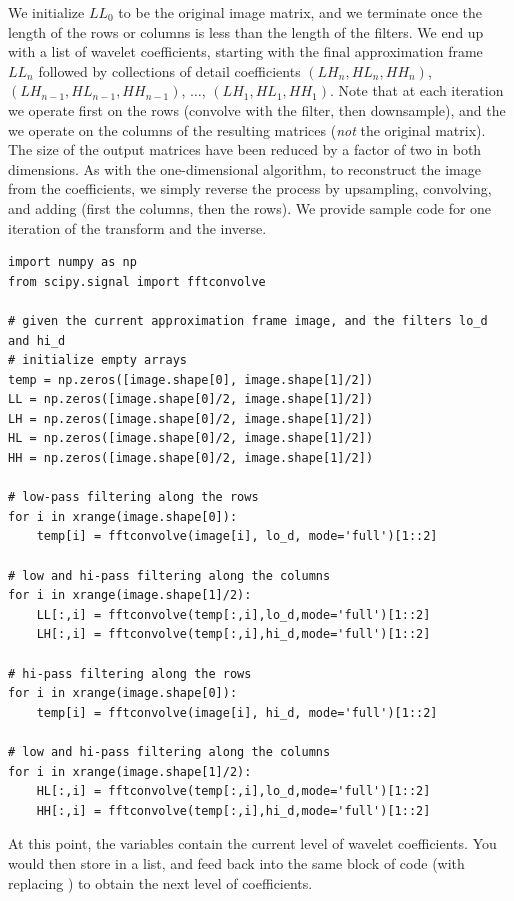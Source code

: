 We initialize $LL_0$ to be the
original image matrix, and we terminate once the length of the rows or columns
is less than the length of the filters. We end up with a list of wavelet
coefficients, starting with the final approximation frame $LL_n$ followed by
collections of detail coefficients $(LH_n,HL_n,HH_n)$, $(LH_{n-1},HL_{n-1},HH_{n-1})$,
$\ldots$, $(LH_1,HL_1,HH_1)$. Note that at each iteration we operate first on the
rows (convolve with the filter, then downsample), and the we operate on the columns
of the resulting matrices (\emph{not} the original matrix). The size of the output
matrices have been reduced by a factor of two in both dimensions. As with the
one-dimensional algorithm, to reconstruct the image from the coefficients, we simply
reverse the process by upsampling, convolving, and adding (first the columns, then
the rows). We provide sample code for one iteration of the transform and the inverse.

\begin{lstlisting}
import numpy as np
from scipy.signal import fftconvolve

# given the current approximation frame image, and the filters lo_d and hi_d
# initialize empty arrays
temp = np.zeros([image.shape[0], image.shape[1]/2])
LL = np.zeros([image.shape[0]/2, image.shape[1]/2])
LH = np.zeros([image.shape[0]/2, image.shape[1]/2])
HL = np.zeros([image.shape[0]/2, image.shape[1]/2])
HH = np.zeros([image.shape[0]/2, image.shape[1]/2])

# low-pass filtering along the rows
for i in xrange(image.shape[0]):
	temp[i] = fftconvolve(image[i], lo_d, mode='full')[1::2]

# low and hi-pass filtering along the columns
for i in xrange(image.shape[1]/2):
	LL[:,i] = fftconvolve(temp[:,i],lo_d,mode='full')[1::2]
    LH[:,i] = fftconvolve(temp[:,i],hi_d,mode='full')[1::2]

# hi-pass filtering along the rows
for i in xrange(image.shape[0]):
	temp[i] = fftconvolve(image[i], hi_d, mode='full')[1::2]

# low and hi-pass filtering along the columns
for i in xrange(image.shape[1]/2):
	HL[:,i] = fftconvolve(temp[:,i],lo_d,mode='full')[1::2]
    HH[:,i] = fftconvolve(temp[:,i],hi_d,mode='full')[1::2]
\end{lstlisting}
At this point, the variables  contain the current level of wavelet coefficients.
You would then store  in a list, and feed  back into the same
block of code (with  replacing ) to obtain the next level of coefficients.

